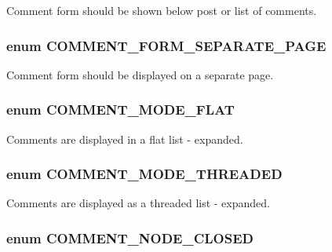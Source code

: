 \label{comment_8module_a1d93fd4a39f5ec90008efb08cde55d45}
Comment form should be shown below post or list of comments. \hypertarget{comment_8module_a7b303650179b46414b9809bac9f15e33}{
\subsubsection[{COMMENT\_\-FORM\_\-SEPARATE\_\-PAGE}]{\setlength{\rightskip}{0pt plus 5cm}enum {\bf COMMENT\_\-FORM\_\-SEPARATE\_\-PAGE}}}
\label{comment_8module_a7b303650179b46414b9809bac9f15e33}
Comment form should be displayed on a separate page. \hypertarget{comment_8module_aaff50a0f429a31a0fc9ecf35198eb7d9}{
\subsubsection[{COMMENT\_\-MODE\_\-FLAT}]{\setlength{\rightskip}{0pt plus 5cm}enum {\bf COMMENT\_\-MODE\_\-FLAT}}}
\label{comment_8module_aaff50a0f429a31a0fc9ecf35198eb7d9}
Comments are displayed in a flat list -\/ expanded. \hypertarget{comment_8module_a0d8620524afbb2361870c03c1c9d95dc}{
\subsubsection[{COMMENT\_\-MODE\_\-THREADED}]{\setlength{\rightskip}{0pt plus 5cm}enum {\bf COMMENT\_\-MODE\_\-THREADED}}}
\label{comment_8module_a0d8620524afbb2361870c03c1c9d95dc}
Comments are displayed as a threaded list -\/ expanded. \hypertarget{comment_8module_a02cedc820778a12afc48724a53acc228}{
\subsubsection[{COMMENT\_\-NODE\_\-CLOSED}]{\setlength{\rightskip}{0pt plus 5cm}enum {\bf COMMENT\_\-NODE\_\-CLOSED}}}
